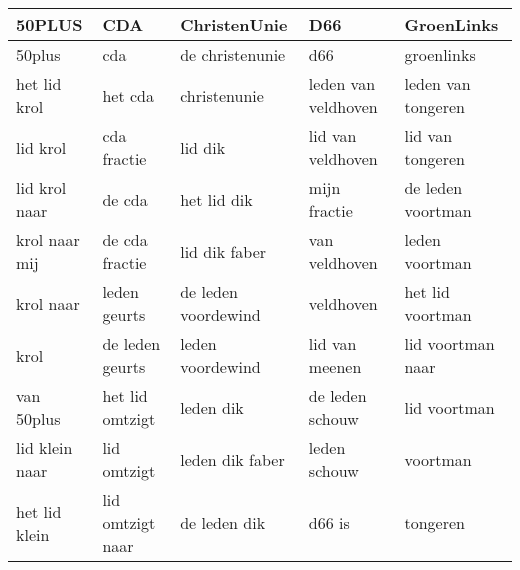 \begin{tabular}{lllll}
\toprule
         50PLUS &               CDA &         ChristenUnie &                  D66 &          GroenLinks \\
\midrule
         50plus &               cda &      de christenunie &                  d66 &          groenlinks \\
   het lid krol &           het cda &         christenunie &  leden van veldhoven &  leden van tongeren \\
       lid krol &       cda fractie &              lid dik &    lid van veldhoven &    lid van tongeren \\
  lid krol naar &            de cda &          het lid dik &         mijn fractie &   de leden voortman \\
  krol naar mij &    de cda fractie &        lid dik faber &        van veldhoven &      leden voortman \\
      krol naar &      leden geurts &  de leden voordewind &            veldhoven &    het lid voortman \\
           krol &   de leden geurts &     leden voordewind &       lid van meenen &   lid voortman naar \\
     van 50plus &   het lid omtzigt &            leden dik &      de leden schouw &        lid voortman \\
 lid klein naar &       lid omtzigt &      leden dik faber &         leden schouw &            voortman \\
  het lid klein &  lid omtzigt naar &         de leden dik &               d66 is &            tongeren \\
\bottomrule
\end{tabular}
